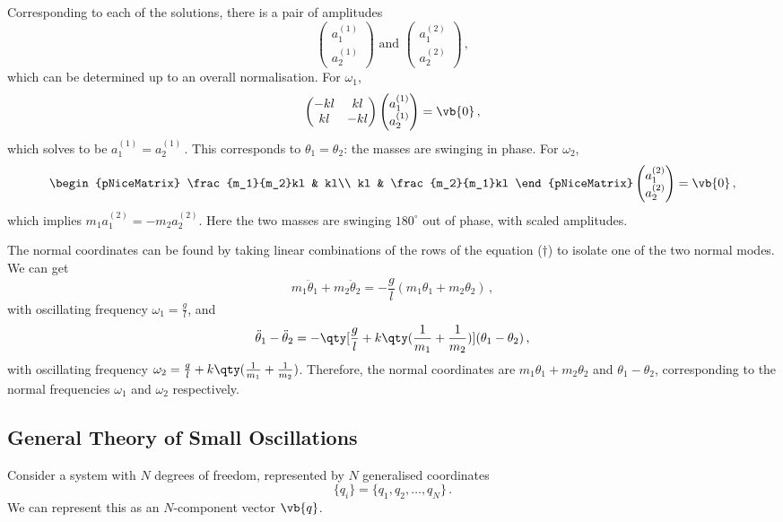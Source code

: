 \documentclass{article}
\theoremstyle{plain}\theoremheaderfont{\normalfont\itshape}\theorembodyfont{\rmfamily}\theoremseparator{.}\newtheorem*{rem}{Remark}\newtheorem*{ex}{Example}\newtheorem*{proof}{Proof}\newtheorem*{altp}{Alternative proof}
\theoremstyle{plain}\theoremheaderfont{\normalfont\bfseries}\theorembodyfont{\rmfamily}\theoremseparator{.}\newtheorem{thm}{Theorem}[section]\newtheorem{lem}[thm]{Lemma}\newtheorem{prop}[thm]{Proposition}\newtheorem*{cor}{Corollary}\newtheorem{defn}[thm]{Definition}\newtheorem{clm}[thm]{Claim}\newtheorem{clminproof}{Claim}
\theoremstyle{break}\theoremheaderfont{\normalfont\itshape}\theorembodyfont{\rmfamily}\theoremseparator{.\medskip}\newtheorem*{proofskip}{Proof}\newtheorem*{exs}{Examples}\newtheorem*{rems}{Remarks}
\theoremstyle{break}\theoremheaderfont{\normalfont\bfseries}\theorembodyfont{\rmfamily}\theoremseparator{.\medskip}\newtheorem{lemskip}[thm]{Lemma}\newtheorem{defnskip}[thm]{Definition}\newtheorem{propskip}[thm]{Proposition}\newtheorem{thmskip}[thm]{Theorem}
\numberwithin{equation}{section}
\begin{document}
	Corresponding to each of the solutions, there is a pair of amplitudes
	\[\begin{pmatrix}
		a_1^{(1)} \\ a_2^{(1)}
	\end{pmatrix}\text{ and }\begin{pmatrix}
		a_1^{(2)} \\ a_2^{(2)}
	\end{pmatrix}\,,\]
	which can be determined up to an overall normalisation. For \(\omega_1\),
	\[\begin{pmatrix}
		-kl & kl \\
		kl & -kl
	\end{pmatrix}\begin{pmatrix}
		a_1^{(1)} \\ a_2^{(1)}
	\end{pmatrix}=\vb{0}\,,\]
	which solves to be \(a_1^{(1)}=a_2^{(1)}\,.\) This corresponds to \(\theta_1=\theta_2\): the masses are swinging in phase. For \(\omega_2\),
	\[\begin{pNiceMatrix}
		\frac{m_1}{m_2}kl & kl\\
		kl & \frac{m_2}{m_1}kl
	\end{pNiceMatrix}\begin{pmatrix}
		a_1^{(2)} \\ a_2^{(2)}
	\end{pmatrix}=\vb{0}\,,\]
	which implies \(m_1a_1^{(2)}=-m_2a_2^{(2)}\). Here the two masses are swinging \(180^\circ\) out of phase, with scaled amplitudes.

	The normal coordinates can be found by taking linear combinations of the rows of the equation (\(\dagger\)) to isolate one of the two normal modes. We can get
	\[m_1\ddot{\theta}_1+m_2\ddot{\theta}_2=-\frac{g}{l}(m_1\theta_1+m_2\theta_2)\,,\]
	with oscillating frequency \(\omega_1=\frac{g}{l}\), and
	\[\ddot{\theta}_1-\ddot{\theta}_2=-\qty[\frac{g}{l}+k\qty(\frac{1}{m_1}+\frac{1}{m_2})](\theta_1-\theta_2)\,,\]
	with oscillating frequency \(\omega_2=\frac{g}{l}+k\qty(\frac{1}{m_1}+\frac{1}{m_2})\). Therefore, the normal coordinates are \(m_1\theta_1+m_2\theta_2\) and \(\theta_1-\theta_2\), corresponding to the normal frequencies \(\omega_1\) and \(\omega_2\) respectively.

	\subsection{General Theory of Small Oscillations}
	Consider a system with \(N\) degrees of freedom, represented by \(N\) generalised coordinates
	\[\{q_i\}=\{q_1,q_2,\dots,q_N\}\,.\]
	We can represent this as an \(N\)-component vector \(\vb{q}\).
\end{document}
